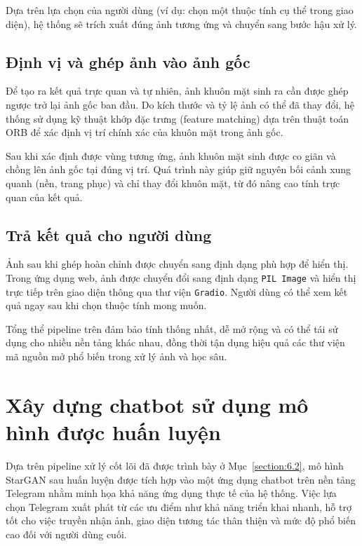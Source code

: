 \documentclass[../DoAn.tex]{subfiles}
\begin{document}
Dựa trên lựa chọn của người dùng (ví dụ: chọn một thuộc tính cụ thể trong giao diện), hệ thống sẽ trích xuất đúng ảnh tương ứng và chuyển sang bước hậu xử lý.

\subsection*{Định vị và ghép ảnh vào ảnh gốc}

Để tạo ra kết quả trực quan và tự nhiên, ảnh khuôn mặt sinh ra cần được ghép ngược trở lại ảnh gốc ban đầu. Do kích thước và tỷ lệ ảnh có thể đã thay đổi, hệ thống sử dụng kỹ thuật khớp đặc trưng (feature matching) dựa trên thuật toán ORB để xác định vị trí chính xác của khuôn mặt trong ảnh gốc.

Sau khi xác định được vùng tương ứng, ảnh khuôn mặt sinh được co giãn và chồng lên ảnh gốc tại đúng vị trí. Quá trình này giúp giữ nguyên bối cảnh xung quanh (nền, trang phục) và chỉ thay đổi khuôn mặt, từ đó nâng cao tính trực quan của kết quả.

\subsection*{Trả kết quả cho người dùng}

Ảnh sau khi ghép hoàn chỉnh được chuyển sang định dạng phù hợp để hiển thị. Trong ứng dụng web, ảnh được chuyển đổi sang định dạng \texttt{PIL Image} và hiển thị trực tiếp trên giao diện thông qua thư viện \texttt{Gradio}. Người dùng có thể xem kết quả ngay sau khi chọn thuộc tính mong muốn.

Tổng thể pipeline trên đảm bảo tính thống nhất, dễ mở rộng và có thể tái sử dụng cho nhiều nền tảng khác nhau, đồng thời tận dụng hiệu quả các thư viện mã nguồn mở phổ biến trong xử lý ảnh và học sâu.






\section{Xây dựng chatbot sử dụng mô hình được huấn luyện}
\label{section:6.3}

Dựa trên pipeline xử lý cốt lõi đã được trình bày ở Mục~\ref{section:6.2}, mô hình StarGAN sau huấn luyện được tích hợp vào một ứng dụng chatbot trên nền tảng Telegram nhằm minh họa khả năng ứng dụng thực tế của hệ thống. Việc lựa chọn Telegram xuất phát từ các ưu điểm như khả năng triển khai nhanh, hỗ trợ tốt cho việc truyền nhận ảnh, giao diện tương tác thân thiện và mức độ phổ biến cao đối với người dùng cuối.
\end{document}
